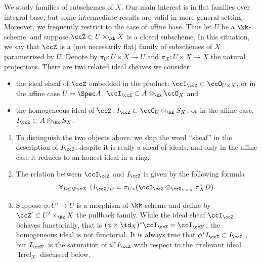 \documentclass[12pt,a4paper]{article}
\newcommand{\Irrel}[1]{\operatorname {Irrel}_{#1}}
\begin{document}
    We study families of subschemes of $X$. Our main interest is in flat families over integral base,
    but some intermediate results are valid in more general setting.
    Moreover, we  frequently restrict to the case of affine base.
Thus let $U$ be a $\kk$-scheme, and suppose $\ccZ\subset U \times_{\kk} X$ is a closed subscheme.
In this situation, we say that $\ccZ$ is a (not necessarily flat) family of subschemes of $X$ parametrised by $U$.
Denote by $\pi_U\colon U\times X \to U$ and
$\pi_X\colon U\times X \to X$ the natural projections.
There are two related ideal sheaves we consider:
\begin{itemize}
 \item  the ideal sheaf of ${\ccZ}$ embedded in the product: $\ccI_{\ccZ}\subset \ccO_{U \times X}$, or in the affine case $U=\Spec A$, $\ccI_{\ccZ} \subset A\otimes_{\kk} \ccO_{X} $ and
 \item  the homogeneous ideal of $\ccZ$: $I_{\ccZ} \subset \ccO_U \otimes_{\kk} S_X$, or in the affine case, $I_{\ccZ} \subset A\otimes_{\kk} S_X$.
\end{itemize}

\begin{rem}
    \label{rem_relations_ideal_sheal_and_homogeneous_ideal}
    \begin{enumerate}
     \item
      To distinguish the two objects above,  we skip the word ``sheaf'' in the description of $I_{\ccZ}$,
        despite it is really a sheaf of ideals,  and only in the affine case it reduces to an honest ideal in a ring.
     \item
        \label{item_relation_between_ideal_sheal_and_homogeneous_ideal}
        The relation between $\ccI_{\ccZ}$ and $I_{\ccZ}$    is given by the following formula
    \[
       \forall_{D\in\Pic X}  \ (I_{\ccZ})_D
       = \pi_{U*}(\ccI_{\ccZ}\otimes_{\ccO_{U \times X}} \pi_X^*D).
    \]
    \item
      Suppose $\phi \colon  U'\to U$ is a morphism of $\kk$-scheme and define by $\ccZ'\subset U'\times_{\kk} X$
      the pullback family.
      While the ideal sheaf $\ccI_{\ccZ}$ behaves functorially, that is $(\phi\times \id_X)^* \ccI_{\ccZ} = \ccI_{\ccZ'}$,
      the homogeneous ideal is not functorial.
       It is always true that $\phi^*I_{\ccZ} \subset I_{\ccZ'}$,
       but $I_{\ccZ'}$ is the saturation of $\phi^*I_{\ccZ}$ with respect to the irrelevant ideal $\Irrel{X}$ discussed below.
    \end{enumerate}
\end{rem}
\end{document}
